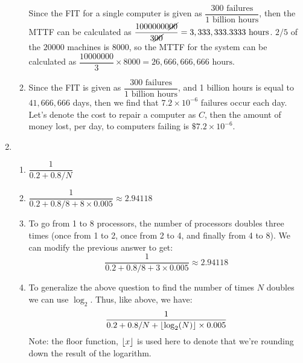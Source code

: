 \documentclass[10pt]{article} %
\DeclarePairedDelimiter{\floor}{\lfloor}{\rfloor}
\begin{document}
\begin{enumerate}
\begin{enumerate}
Since the FIT for a single computer is given as $\dfrac{300 \text{ failures}}{\text{1 billion hours}}$, then the MTTF can be calculated as $\dfrac{10000000\cancel{00}}{3\cancel{00}} = 3,333,333.3333 \text{ hours}$.  $2/5$ of the $20000$ machines is $8000$, so the MTTF for the system can be calculated as $\dfrac{10000000}{3} \times 8000 = 26,666,666,666 \text{ hours}$.  

\item

Since the FIT is given as $\dfrac{300 \text{ failures}}{1 \text{ billion hours}}$, and 1 billion hours is equal to $41,666,666$ days, then we find that $7.2 \times 10^{-6}$ failures occur each day.  Let's denote the cost to repair a computer as $C$, then the amount of money lost, per day, to computers failing is $\$7.2 \times 10^{-6}$.  

\end{enumerate}

\item %

\begin{enumerate}

\item $\dfrac{1}{0.2 + 0.8/N}$

\item $\dfrac{1}{0.2 + 0.8/8 + 8 \times 0.005} \approx 2.94118$

\item To go from 1 to 8 processors, the number of processors doubles three times (once from 1 to 2, once from 2 to 4, and finally from 4 to 8).  We can modify the previous answer to get: $$\dfrac{1}{0.2 + 0.8/8 + 3 \times 0.005} \approx 2.94118$$

\item To generalize the above question to find the number of times $N$ doubles we can use $\log_2$.  Thus, like above, we have:
$$ \dfrac{1}{0.2 + 0.8/N + \floor*{\log_2(N)} \times 0.005} $$
Note: the floor function, $\floor*{x}$ is used here to denote that we're rounding down the result of the logarithm.  

\end{enumerate}

\end{enumerate}
\end{document}
